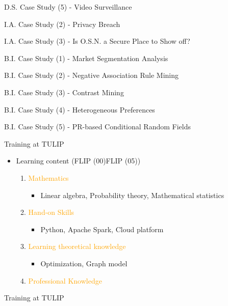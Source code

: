 \documentclass[
 size=14pt,
 paper=smartboard,  %
 mode=present, 		%
 display=slides, 	%
 style=tuliplab,  	%
 pauseslide,
 fleqn,leqno]{powerdot}
\begin{document}
\begin{slide}[toc=,bm=]{D.S. Case Study (5) - Video Surveillance}
\begin{slide}[toc=,bm=]{I.A. Case Study (2) - Privacy Breach}
\begin{slide}[toc=,bm=]{I.A. Case Study (3) - Is O.S.N. a Secure Place to Show off?}
\begin{slide}[toc=,bm=]{B.I. Case Study (1) - Market Segmentation Analysis}
\begin{slide}[toc=,bm=]{B.I. Case Study (2) - Negative Association Rule Mining}
\begin{slide}[toc=,bm=]{B.I. Case Study (3) - Contrast Mining}
\begin{slide}[toc=,bm=]{B.I. Case Study (4) - Heterogeneous Preferences}
\begin{slide}[toc=,bm=]{B.I. Case Study (5) - PR-based Conditional Random Fields}
\begin{slide}[toc=,bm=]{Training at TULIP}
    \begin{itemize}
      \item Learning content (FLIP (00)\texttildelow FLIP (05))
        \begin{enumerate}
          \item \textcolor{orange}{Mathematics}
            \begin{itemize}
              \item Linear algebra,
                    Probability theory,
                    Mathematical statistics
            \end{itemize}
          \item \textcolor{orange}{Hand-on Skills}
            \begin{itemize}
              \item Python,
                    Apache Spark,
                    Cloud platform
            \end{itemize}
          \item \textcolor{orange}{Learning theoretical knowledge}
            \begin{itemize}
              \item Optimization,
                    Graph model
            \end{itemize}
          \item \textcolor{orange}{Professional Knowledge}
        \end{enumerate}
    \end{itemize}
\end{slide}




\begin{slide}[toc=,bm=]{Training at TULIP}
\begin{center}


\end{center}
\end{slide}
\end{slide}
\end{slide}
\end{slide}
\end{slide}
\end{slide}
\end{slide}
\end{slide}
\end{slide}
\end{document}

